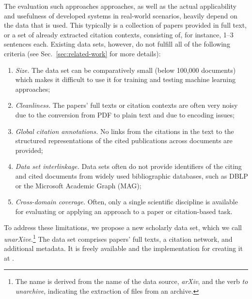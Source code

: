 The evaluation such approaches approaches, as well as the actual applicability and usefulness of developed systems in real-world scenarios, heavily depend on the data that is used. This typically is a collection of papers provided in full text, or a set of already extracted citation contexts, consisting of, for instance, 1--3 sentences each. Existing data sets, however, do not fulfill all of the following criteria (see Sec.~\ref{sec:related-work} for more details):
\begin{enumerate}
 \item \textit{Size.} The data set can be comparatively small (below 100,000 documents) which makes it difficult to use it for training and testing machine learning approaches; 
 \item \textit{Cleanliness.} The papers' full texts or citation contexts are often very noisy due to the conversion from PDF to plain text and due to encoding issues;
 \item \textit{Global citation annotations.} No links from the citations in the text to the structured representations of the cited publications across documents are provided;
 \item \textit{Data set interlinkage.} Data sets often do not provide identifiers of the citing and cited documents from widely used bibliographic databases, such as DBLP or the Microsoft Academic Graph (MAG);
 \item \textit{Cross-domain coverage.} Often, only a single scientific discipline is available for evaluating or applying an approach to a paper or citation-based task.
\end{enumerate}

To address these limitations, we propose a new scholarly data set, which we call \emph{unarXive}.\footnote{The name is derived from the name of the data source, \textit{arXiv}, and the verb \textit{to unarchive}, indicating the extraction of files from an archive.} The data set comprises papers' full texts, a citation network, and additional metadata.
It is freely available  and the implementation for creating it at .

